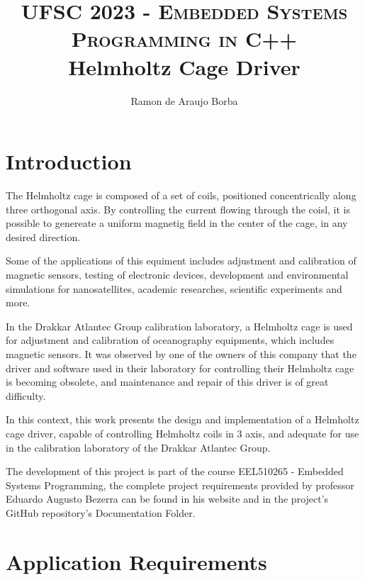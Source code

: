 \documentclass[10pt,twocolumn,letterpaper]{article}
\title{
        \usefont{OT1}{bch}{b}{n}
        \normalfont \normalsize \textsc{UFSC 2023 - Embedded Systems Programming in C++} \\ [10pt]
        \huge Helmholtz Cage Driver \\
}
\author[1]{Ramon de Araujo Borba}
\affil[1]{UFSC - Universidade Federal de Santa Catarina}
\begin{document}
\maketitle

\section{Introduction}

The Helmholtz cage is composed of a set of coils, positioned concentrically along three orthogonal axis. By controlling the current flowing through the coisl, it is possible to genereate a uniform magnetig field in the center of the cage, in any desired direction.

Some of the applications of this equiment includes adjustment and calibration of magnetic sensors, testing of electronic devices, development and environmental simulations for nanosatellites, academic researches, scientific experiments and more.

In the Drakkar Atlantec Group calibration laboratory, a Helmholtz cage is used for adjustment and calibration of oceanography equipments, which includes magnetic sensors.
It was observed by one of the owners of this company that the driver and software used in their laboratory for controlling their Helmholtz cage is becoming obsolete, and maintenance and repair of this driver is of great difficulty.

In this context, this work presents the design and implementation of a Helmholtz cage driver, capable of controlling Helmholtz coils in 3 axis, and adequate for use in the calibration laboratory of the Drakkar Atlantec Group.

The development of this project is part of the course EEL510265 - Embedded Systems Programming, the complete project requirements provided by professor Eduardo Augusto Bezerra can be found in his website\cite{projspecs} and in the project's GitHub repository's\cite{mygit} Documentation Folder.

\section{Application Requirements}
\end{document}

